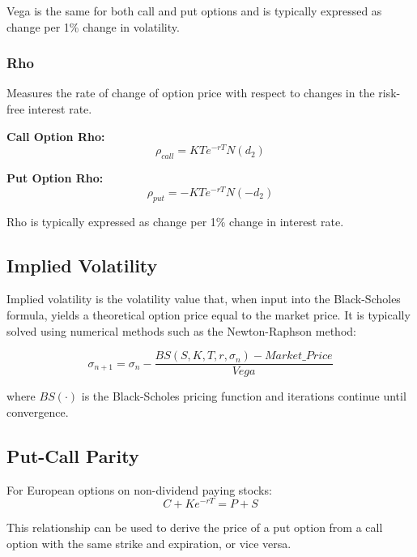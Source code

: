 \documentclass{article}
\begin{document}
Vega is the same for both call and put options and is typically expressed as change per 1\% change in volatility.

\subsubsection{Rho}
Measures the rate of change of option price with respect to changes in the risk-free interest rate.

\textbf{Call Option Rho:}
\begin{equation}
\rho_{call} = KTe^{-rT}N(d_2)
\end{equation}

\textbf{Put Option Rho:}
\begin{equation}
\rho_{put} = -KTe^{-rT}N(-d_2)
\end{equation}

Rho is typically expressed as change per 1\% change in interest rate.

\subsection{Implied Volatility}
Implied volatility is the volatility value that, when input into the Black-Scholes formula, yields a theoretical option price equal to the market price. It is typically solved using numerical methods such as the Newton-Raphson method:

\begin{equation}
\sigma_{n+1} = \sigma_n - \frac{BS(S, K, T, r, \sigma_n) - Market\_Price}{Vega}
\end{equation}

where $BS(\cdot)$ is the Black-Scholes pricing function and iterations continue until convergence.

\subsection{Put-Call Parity}
For European options on non-dividend paying stocks:
\begin{equation}
C + Ke^{-rT} = P + S
\end{equation}

This relationship can be used to derive the price of a put option from a call option with the same strike and expiration, or vice versa.
\end{document}
